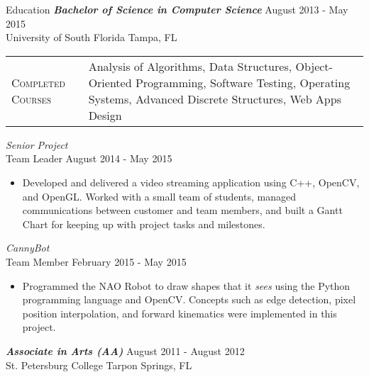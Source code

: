\begin{section}{Education}
  {\sl \textbf{Bachelor of Science in Computer Science}} \hfill August 2013 - May 2015 \\
  University of South Florida \hfill Tampa, FL \\
  \begin{tabularx}{\linewidth}{@{}l X@{}}
    \textsc{Completed Courses} &\small{Analysis of Algorithms, Data Structures, Object-Oriented Programming, Software Testing, Operating Systems, Advanced Discrete Structures, Web Apps Design}\\
  \end{tabularx}
  {\sl Senior Project} \\ Team Leader \hfill August 2014 - May 2015
  \begin{itemize}
    \item Developed and delivered a video streaming application using C++, OpenCV, and OpenGL. Worked with a small team of students, managed communications between customer and team members, and built a Gantt Chart for keeping up with project tasks and milestones.
  \end{itemize}
  {\sl CannyBot} \\ Team Member \hfill February 2015 - May 2015
  \begin{itemize}
    \item Programmed the NAO Robot to draw shapes that it \textit{sees} using the Python programming language and OpenCV. Concepts such as edge detection, pixel position interpolation, and forward kinematics were implemented in this project.
  \end{itemize}

  {\sl \textbf{Associate in Arts (AA)}} \hfill August 2011 - August 2012 \\
  St. Petersburg College \hfill Tarpon Springs, FL \\
\end{section}
